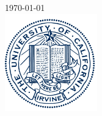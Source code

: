\documentclass[12pt]{article}
\begin{document}
\begin{titlepage}

{\large \today}\\[2cm] %


\includegraphics[width=0.3\textwidth]{pics/logo.jpg}


\vfill %

\end{titlepage}





%
%
\normalsize
%
\end{document}
